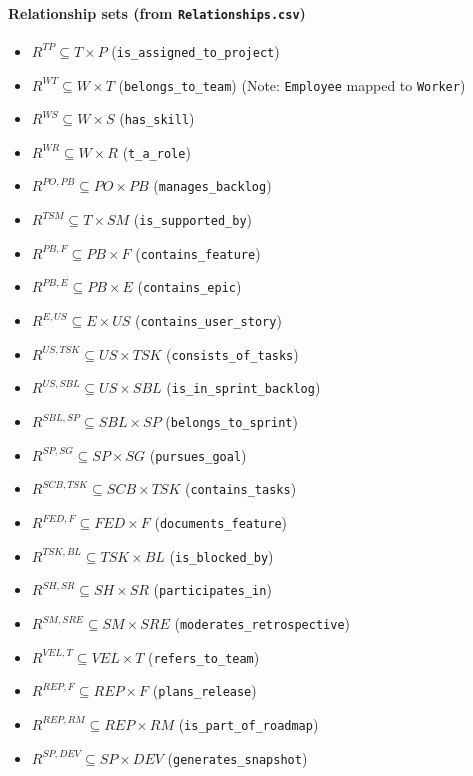 \documentclass[11pt,a4paper]{article}
\begin{document}
\paragraph{Relationship sets (from \texttt{Relationships.csv})}
\begin{itemize}[leftmargin=2em]
  \item $R^{TP}\subseteq T\times P$ (\texttt{is\_assigned\_to\_project})
  \item $R^{WT}\subseteq W\times T$ (\texttt{belongs\_to\_team}) \quad (Note: \texttt{Employee} mapped to \texttt{Worker})
  \item $R^{WS}\subseteq W\times S$ (\texttt{has\_skill})
  \item $R^{WR}\subseteq W\times R$ (\texttt{t\_a\_role})
  \item $R^{PO,PB}\subseteq PO\times PB$ (\texttt{manages\_backlog})
  \item $R^{TSM}\subseteq T\times SM$ (\texttt{is\_supported\_by})
  \item $R^{PB,F}\subseteq PB\times F$ (\texttt{contains\_feature})
  \item $R^{PB,E}\subseteq PB\times E$ (\texttt{contains\_epic})
  \item $R^{E,US}\subseteq E\times US$ (\texttt{contains\_user\_story})
  \item $R^{US,TSK}\subseteq US\times TSK$ (\texttt{consists\_of\_tasks})
  \item $R^{US,SBL}\subseteq US\times SBL$ (\texttt{is\_in\_sprint\_backlog})
  \item $R^{SBL,SP}\subseteq SBL\times SP$ (\texttt{belongs\_to\_sprint})
  \item $R^{SP,SG}\subseteq SP\times SG$ (\texttt{pursues\_goal})
  \item $R^{SCB,TSK}\subseteq SCB\times TSK$ (\texttt{contains\_tasks})
  \item $R^{FED,F}\subseteq FED\times F$ (\texttt{documents\_feature})
  \item $R^{TSK,BL}\subseteq TSK\times BL$ (\texttt{is\_blocked\_by})
  \item $R^{SH,SR}\subseteq SH\times SR$ (\texttt{participates\_in})
  \item $R^{SM,SRE}\subseteq SM\times SRE$ (\texttt{moderates\_retrospective})
  \item $R^{VEL,T}\subseteq VEL\times T$ (\texttt{refers\_to\_team})
  \item $R^{REP,F}\subseteq REP\times F$ (\texttt{plans\_release})
  \item $R^{REP,RM}\subseteq REP\times RM$ (\texttt{is\_part\_of\_roadmap})
  \item $R^{SP,DEV}\subseteq SP\times DEV$ (\texttt{generates\_snapshot})
\end{itemize}
\end{document}
